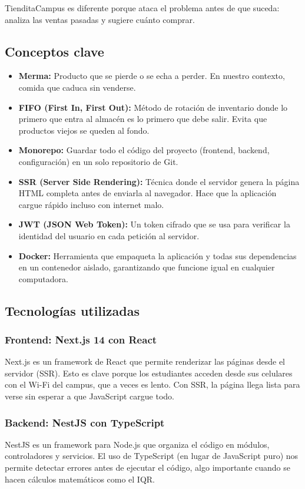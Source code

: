 \documentclass[12pt, a4paper]{article}
\begin{document}
TienditaCampus es diferente porque ataca el problema antes de que suceda: analiza las ventas pasadas y sugiere cuánto comprar.

\subsection{Conceptos clave}
\begin{itemize}
    \item \textbf{Merma:} Producto que se pierde o se echa a perder. En nuestro contexto, comida que caduca sin venderse.
    \item \textbf{FIFO (First In, First Out):} Método de rotación de inventario donde lo primero que entra al almacén es lo primero que debe salir. Evita que productos viejos se queden al fondo.
    \item \textbf{Monorepo:} Guardar todo el código del proyecto (frontend, backend, configuración) en un solo repositorio de Git.
    \item \textbf{SSR (Server Side Rendering):} Técnica donde el servidor genera la página HTML completa antes de enviarla al navegador. Hace que la aplicación cargue rápido incluso con internet malo.
    \item \textbf{JWT (JSON Web Token):} Un token cifrado que se usa para verificar la identidad del usuario en cada petición al servidor.
    \item \textbf{Docker:} Herramienta que empaqueta la aplicación y todas sus dependencias en un contenedor aislado, garantizando que funcione igual en cualquier computadora.
\end{itemize}

\subsection{Tecnologías utilizadas}

\subsubsection{Frontend: Next.js 14 con React}
Next.js es un framework de React que permite renderizar las páginas desde el servidor (SSR). Esto es clave porque los estudiantes acceden desde sus celulares con el Wi-Fi del campus, que a veces es lento. Con SSR, la página llega lista para verse sin esperar a que JavaScript cargue todo.

\subsubsection{Backend: NestJS con TypeScript}
NestJS es un framework para Node.js que organiza el código en módulos, controladores y servicios. El uso de TypeScript (en lugar de JavaScript puro) nos permite detectar errores antes de ejecutar el código, algo importante cuando se hacen cálculos matemáticos como el IQR.
\end{document}
